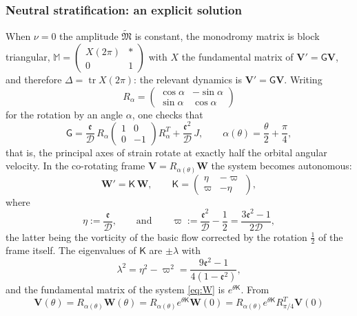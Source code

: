 \documentclass[10pt,a4paper]{amsart}
\newcommand{\Msf}{\mathsf{G}}
\newcommand{\B}{{\mathfrak{M}}}
\newcommand{\D}{\mathcal{D}}
\newcommand{\ee}{\mathfrak{e}}
\newcommand{\tr}{\operatorname{tr}}     %
\begin{document}
\subsubsection{Neutral stratification: an explicit solution}\label{sec_neutral}
When $\nu=0$ the amplitude $\widetilde{\B}$ is constant, the monodromy matrix is block triangular, $\mathbb M=\left(\begin{smallmatrix}X(2\pi)&*\\0&1\end{smallmatrix}\right)$ with $X$ the fundamental matrix of $\mathbf V'=\Msf\mathbf V$, and therefore $\Delta=\tr X(2\pi)$: the relevant dynamics is $\mathbf V'=\Msf\mathbf V$. Writing
\[
R_\alpha=\begin{pmatrix}
    \cos\alpha & -\sin\alpha\\
    \sin\alpha &\cos\alpha
\end{pmatrix}
\]
for the rotation by an angle $\alpha$, one checks that
\[
\Msf=\frac{\ee}{\D}\,R_{\alpha}\begin{pmatrix}1&0\\0&-1\end{pmatrix}R_{\alpha}^T+\frac{\ee^2}{\D}\,J,\qquad \alpha(\theta)=\frac{\theta}{2}+\frac{\pi}{4},
\]
that is, the principal axes of strain rotate at exactly half the orbital angular velocity. In the co-rotating frame $\mathbf V=R_{\alpha(\theta)}\mathbf W$ the system becomes autonomous:
\begin{equation}\label{eq:W}
\mathbf W'=\mathsf K\,\mathbf W,\qquad
\mathsf K=\begin{pmatrix}\eta&-\varpi\\ \varpi&-\eta\end{pmatrix},
\end{equation}
where
\begin{equation}\label{eq:gsome}
\eta:=\frac{\ee}{\D},\qquad\text{and}\qquad
\varpi:=\frac{\ee^{2}}{\D}-\frac12=\frac{3\ee^{2}-1}{2\D},
\end{equation}
the latter being the vorticity of the basic flow corrected by the rotation $\frac{1}{2}$ of the frame itself. The eigenvalues of $\mathsf K$ are $\pm\lambda$ with
\begin{equation}\label{eq:lambda}
\lambda^2=\eta^2-\varpi^2=\frac{9\ee^2-1}{4(1-\ee^2)},
\end{equation}
and the fundamental matrix of the system \eqref{eq:W} is $e^{\theta\mathsf K}$. From 
\begin{equation}
    \mathbf V(\theta)=R_{\alpha(\theta)}\mathbf W(\theta)=R_{\alpha(\theta)}e^{\theta\mathsf K}\mathbf W(0) =R_{\alpha(\theta)}e^{\theta\mathsf K}R_{\pi/4}^T \mathbf V(0)
\end{equation}
\end{document}
